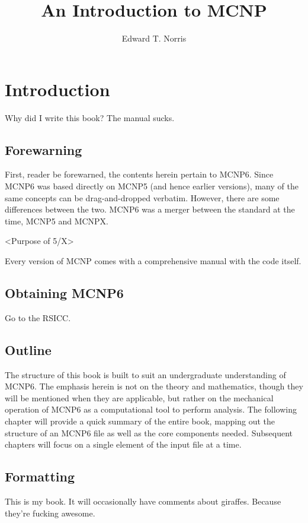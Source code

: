 \documentclass[10pt,a4paper]{book}
\author{Edward T. Norris}
\title{An Introduction to MCNP}
\begin{document}
\maketitle

\tableofcontents

\chapter{Introduction}

Why did I write this book? The manual sucks.

\section{Forewarning}
First, reader be forewarned, the contents herein pertain to MCNP6. Since MCNP6 was based directly on MCNP5 (and hence earlier versions), many of the same concepts can be drag-and-dropped verbatim. However, there are some differences between the two. MCNP6 was a merger between the standard at the time, MCNP5 and MCNPX.

<Purpose of 5/X>

Every version of MCNP comes with a comprehensive manual with the code itself.

\section{Obtaining MCNP6}

Go to the RSICC.

\section{Outline}

The structure of this book is built to suit an undergraduate understanding of MCNP6. The emphasis herein is not on the theory and mathematics, though they will be mentioned when they are applicable, but rather on the mechanical operation of MCNP6 as a computational tool to perform analysis. The following chapter will provide a quick summary of the entire book, mapping out the structure of an MCNP6 file as well as the core components needed. Subsequent chapters will focus on a single element of the input file at a time.


\section{Formatting}
This is my book. It will occasionally have comments about giraffes. Because they're fucking awesome.
\end{document}
